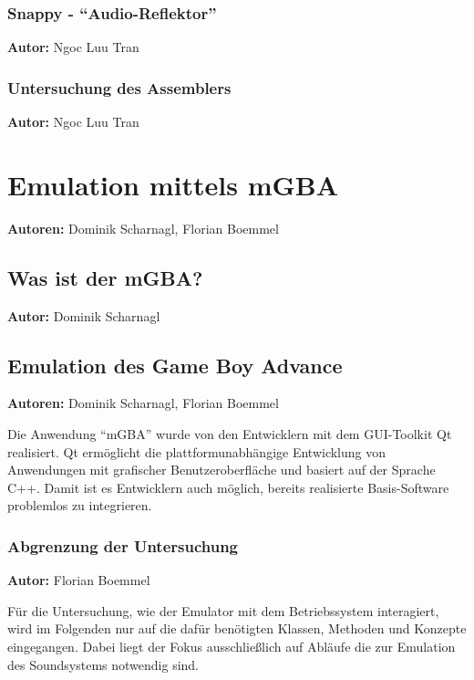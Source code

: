 \documentclass[11pt,a4paper]{scrartcl}
\newcommand{\AutorDominik} {
    \vspace{-4mm}
    \large \textbf{Autor:} Dominik Scharnagl \normalsize
    \vspace{2mm}
}
\newcommand{\AutorDominikFlorian} {
    \vspace{-4mm}
    \large \textbf{Autoren:} Dominik Scharnagl, Florian Boemmel \normalsize
    \vspace{2mm}
}
\newcommand{\AutorFlorian} {
    \vspace{-4mm}
    \large \textbf{Autor:} Florian Boemmel \normalsize
    \vspace{2mm}
}
\newcommand{\AutorNgoc} {
    \vspace{-4mm}
    \large \textbf{Autor:} Ngoc Luu Tran \normalsize
    \vspace{2mm}
}
\begin{document}

\subsubsection{Snappy - \enquote{Audio-Reflektor}}
\AutorNgoc


\subsubsection{Untersuchung des Assemblers}
\AutorNgoc


\newpage


\section{Emulation mittels mGBA} \label{EmulationMittelsMGBA}
\AutorDominikFlorian


\subsection{Was ist der mGBA?}
\AutorDominik


\subsection{Emulation des Game Boy Advance} \label{EmulationGameBoyAdvance}
\AutorDominikFlorian

Die Anwendung \enquote{mGBA} wurde von den Entwicklern mit dem GUI-Toolkit Qt realisiert. Qt erm\"oglicht die plattformunabh\"angige Entwicklung von Anwendungen mit grafischer Benutzeroberfl\"ache und basiert auf der Sprache C++. Damit ist es Entwicklern auch m\"oglich, bereits realisierte Basis-Software problemlos zu integrieren.


\subsubsection{Abgrenzung der Untersuchung}
\AutorFlorian

F\"ur die Untersuchung, wie der Emulator mit dem Betriebssystem interagiert, wird im Folgenden nur auf die daf\"ur ben\"otigten Klassen, Methoden und Konzepte eingegangen. Dabei liegt der Fokus ausschlie{\ss}lich auf Abl\"aufe die zur Emulation des Soundsystems notwendig sind.
\end{document}
